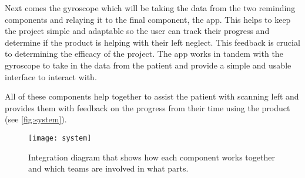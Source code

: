 Next comes the gyroscope which will be taking the data from the two reminding
components and relaying it to the final component, the app. This helps to keep
the project simple and adaptable so the user can track their progress and
determine if the product is helping with their left neglect. This feedback is
crucial to determining the efficacy of the project. The app works in tandem with
the gyroscope to take in the data from the patient and provide a simple and
usable interface to interact with. 

All of these components help together to assist the patient with scanning left
and provides them with feedback on the progress from their time using the
product (see \autoref{fig:system}). 

\begin{figure}[h]
  \centering
  \texttt{[image: system]}
  \caption[System Diagram]{Integration diagram that shows how each component
    works together and which teams are involved in what parts.}
  \label{fig:system}
\end{figure}

